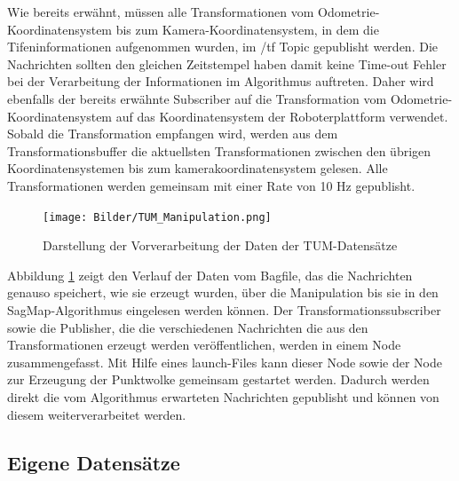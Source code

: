 Wie bereits erwähnt, müssen alle Transformationen vom Odometrie-Ko\-or\-di\-na\-ten\-sys\-tem bis zum Kamera-Koordinatensystem, in dem die Tifeninformationen aufgenommen wurden, im /tf Topic gepublisht werden. Die Nachrichten sollten den gleichen Zeitstempel haben damit keine  Time-out Fehler bei der Verarbeitung der Informationen im Algorithmus auftreten. Daher wird ebenfalls der bereits erwähnte Subscriber auf die Transformation vom Odometrie-Koordinatensystem auf das Koordinatensystem der Roboterplattform verwendet. Sobald die Transformation empfangen wird, werden aus dem Transformationsbuffer die aktuellsten Transformationen zwischen den übrigen Koordinatensystemen bis zum kamerakoordinatensystem gelesen. Alle Transformationen werden gemeinsam  mit einer Rate von 10 Hz gepublisht. 

\begin{figure}
	\centering
	\texttt{[image: Bilder/TUM\_Manipulation.png]}
	\caption{Darstellung der Vorverarbeitung der Daten der TUM-Datensätze} 
	\label{fig:tum_manipulation}
\end{figure}

Abbildung \ref{fig:tum_manipulation} zeigt den Verlauf der Daten vom Bagfile, das die Nachrichten genauso speichert, wie sie erzeugt wurden, über die Manipulation bis sie in den SagMap-Algorithmus eingelesen werden können. Der Transformationssubscriber sowie die Publisher, die die verschiedenen Nachrichten die aus den Transformationen erzeugt werden veröffentlichen, werden in einem Node zusammengefasst. Mit Hilfe eines launch-Files kann dieser Node sowie der Node zur Erzeugung der Punktwolke gemeinsam gestartet werden. Dadurch werden direkt die vom Algorithmus erwarteten Nachrichten gepublisht und können von diesem weiterverarbeitet werden.  

\subsection[Eigener Datensatz (Schmelzer)]{Eigene Datensätze}

